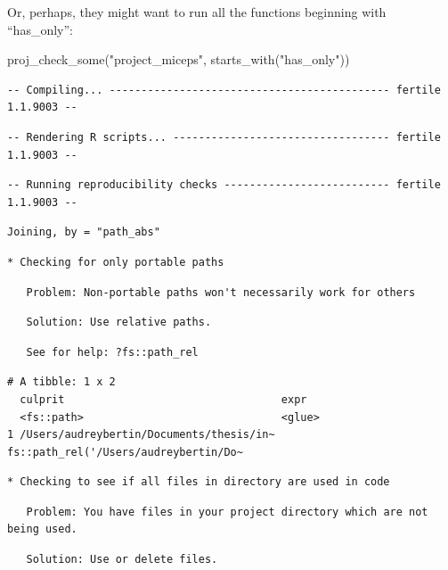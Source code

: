 \documentclass[12pt,twoside]{reedthesis}
\newenvironment{Shaded}{\begin{snugshade}}{\end{snugshade}}
\newcommand{\FunctionTok}[1]{\textcolor[rgb]{0.00,0.00,0.00}{#1}}
\newcommand{\NormalTok}[1]{#1}
\newcommand{\StringTok}[1]{\textcolor[rgb]{0.31,0.60,0.02}{#1}}
\begin{document}
Or, perhaps, they might want to run all the functions beginning with ``has\_only'':
\begin{Shaded}
\begin{Highlighting}[]
\FunctionTok{proj\_check\_some}\NormalTok{(}\StringTok{"project\_miceps"}\NormalTok{, }\FunctionTok{starts\_with}\NormalTok{(}\StringTok{"has\_only"}\NormalTok{))}
\end{Highlighting}
\end{Shaded}
\footnotesize
\begin{verbatim}
-- Compiling... -------------------------------------------- fertile 1.1.9003 --
\end{verbatim}
\begin{verbatim}
-- Rendering R scripts... ---------------------------------- fertile 1.1.9003 --
\end{verbatim}
\begin{verbatim}
-- Running reproducibility checks -------------------------- fertile 1.1.9003 --
\end{verbatim}
\begin{verbatim}
Joining, by = "path_abs"
\end{verbatim}
\begin{verbatim}
* Checking for only portable paths
\end{verbatim}
\begin{verbatim}
   Problem: Non-portable paths won't necessarily work for others
\end{verbatim}
\begin{verbatim}
   Solution: Use relative paths.
\end{verbatim}
\begin{verbatim}
   See for help: ?fs::path_rel
\end{verbatim}
\begin{verbatim}
# A tibble: 1 x 2
  culprit                                  expr                                 
  <fs::path>                               <glue>                               
1 /Users/audreybertin/Documents/thesis/in~ fs::path_rel('/Users/audreybertin/Do~
\end{verbatim}
\begin{verbatim}
* Checking to see if all files in directory are used in code
\end{verbatim}
\begin{verbatim}
   Problem: You have files in your project directory which are not being used.
\end{verbatim}
\begin{verbatim}
   Solution: Use or delete files.
\end{verbatim}
\end{document}
